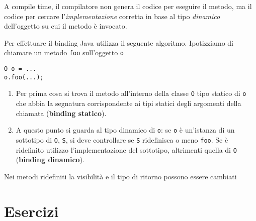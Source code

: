 \documentclass{article}
\begin{document}
A compile time, il compilatore non genera il codice per eseguire il metodo, ma il codice per cercare l'\emph{implementazione} corretta in base al tipo \emph{dinamico} dell'oggetto su cui il metodo \`e invocato.

Per effettuare il binding Java utilizza il seguente algoritmo.
Ipotizziamo di chiamare un metodo \texttt{foo} sull'oggetto \texttt{o}


\begin{lstlisting}
O o = ...
o.foo(...);
\end{lstlisting}

\begin{enumerate}
	\item Per prima cosa si trova il metodo all'interno della classe \texttt{O} tipo statico di \texttt{o} che abbia la segnatura corrispondente ai tipi statici degli argomenti della chiamata
	(\textbf{binding statico}).
	\item A questo punto si guarda al tipo dinamico di \texttt{o}: se 
	\texttt{o} è un'istanza di un sottotipo di \texttt{O}, \texttt{S}, si deve controllare
	se \texttt{S} ridefinisca o meno \texttt{foo}. Se è ridefinito utilizzo l'implementazione del
	sottotipo, altrimenti quella di \texttt{O} (\textbf{binding dinamico}).
\end{enumerate}

Nei metodi ridefiniti la visibilità e il tipo di ritorno possono essere cambiati







\section{Esercizi}
\end{document}
